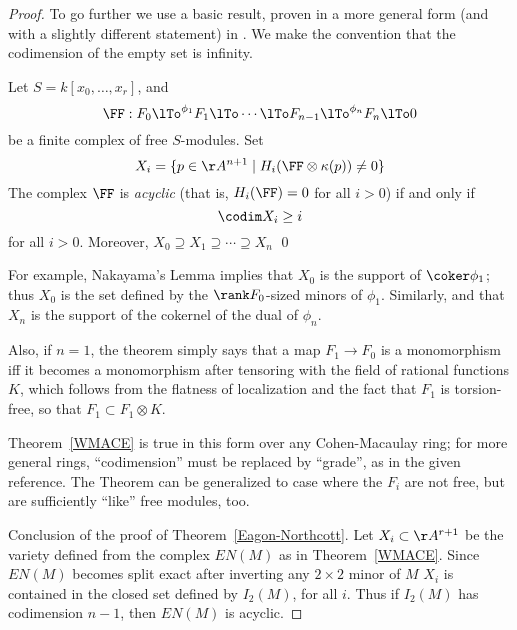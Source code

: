 \begin{proof}
To go further we use a basic result, proven in a more general form (and with a slightly different statement) in \cite[Theorem 20.9]{Eisenbud 1995}. We make the convention
that the codimension of the empty set is infinity.

\begin{theorem}\label{WMACE}
 Let $S = k[x_0,\dots, x_r]$, and
 $$ 
\FF:  F_0\lTo^{\phi_1}F_1 \lTo \cdots \lTo F_{n-1}\lTo^{\phi_n} F_n\lTo 0
 $$
be a finite complex of free $S$-modules. Set
$$
X_i = \{p\in \AA^{n+1} \mid  H_i(\FF \otimes \kappa(p)) \neq 0\}
$$
The complex $\FF$ is \emph{acyclic} (that is, $H_i(\FF) = 0$ for all $i>0$) if and only if
$$
\codim X_i \geq i
$$
for all $i>0$. Moreover, $X_{0}\supseteq X_{1}\supseteq \cdots \supseteq X_{n}$
\qed
\end{theorem}

For example, Nakayama's Lemma implies that $X_{0}$ is the support of $\coker \phi_{1}$; thus $X_{0}$ is the set defined by the $\rank F_{0}$-sized minors of $\phi_{1}$. Similarly, 
and that $X_{n}$ is the support of the cokernel of the dual of $\phi_{n}$. 

Also, if $n=1$, the theorem simply says that a map $F_1\to F_0$ is a monomorphism iff it becomes a monomorphism after tensoring with the field of rational functions $K$, which follows from the flatness of
localization and the fact that $F_1$ is torsion-free, so that
$F_1 \subset F_1 \otimes K$. 

\begin{fact}
Theorem~\ref{WMACE} is true in this form over any Cohen-Macaulay ring; for more general
rings, ``codimension'' must be replaced by ``grade'', as in the given reference.
The Theorem can be generalized
to case where the $F_i$ are not free, but are sufficiently ``like'' free modules, too.
\end{fact}

Conclusion of the proof of Theorem~\ref{Eagon-Northcott}.
Let $X_{i}\subset \AA^{r+1}$ be the variety defined from the complex $EN(M)$ as in 
Theorem~\ref{WMACE}. Since $EN(M)$ becomes split exact after inverting any $2\times 2$ minor of $M$
$X_{i}$ is
contained in the closed set defined by $I_{2}(M)$, for all $i$. Thus if $I_{2}(M)$ has codimension $n-1$,
then $EN(M)$ is acyclic. 
\end {proof}

